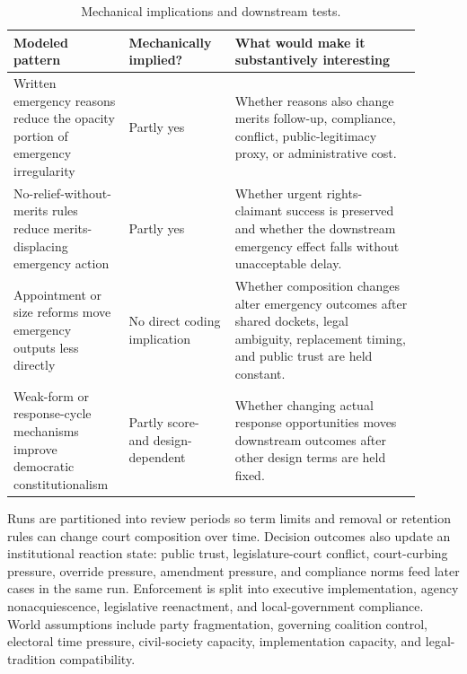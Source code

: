 \documentclass[
  journal=small,
  manuscript=research-article,
  year=2026
]{cup-journal}
\begin{document}
\begin{table}[hbt!]
\centering
\caption{Mechanical implications and downstream tests.}
\label{tab:mechanical-diagnostic}
\scriptsize
\setlength{\tabcolsep}{3pt}
\begin{tabular}{@{}L{0.24\linewidth}L{0.24\linewidth}L{0.42\linewidth}@{}}
\toprule
Modeled pattern & Mechanically implied? & What would make it substantively interesting \\
\midrule
Written emergency reasons reduce the opacity portion of emergency irregularity & Partly yes & Whether reasons also change merits follow-up, compliance, conflict, public-legitimacy proxy, or administrative cost. \\
No-relief-without-merits rules reduce merits-displacing emergency action & Partly yes & Whether urgent rights-claimant success is preserved and whether the downstream emergency effect falls without unacceptable delay. \\
Appointment or size reforms move emergency outputs less directly & No direct coding implication & Whether composition changes alter emergency outcomes after shared dockets, legal ambiguity, replacement timing, and public trust are held constant. \\
Weak-form or response-cycle mechanisms improve democratic constitutionalism & Partly score- and design-dependent & Whether changing actual response opportunities moves downstream outcomes after other design terms are held fixed. \\
\bottomrule
\end{tabular}
\end{table}

Runs are partitioned into review periods so term limits and removal or retention rules can change court composition over time. Decision outcomes also update an institutional reaction state: public trust, legislature-court conflict, court-curbing pressure, override pressure, amendment pressure, and compliance norms feed later cases in the same run. Enforcement is split into executive implementation, agency nonacquiescence, legislative reenactment, and local-government compliance. World assumptions include party fragmentation, governing coalition control, electoral time pressure, civil-society capacity, implementation capacity, and legal-tradition compatibility.
\end{document}
